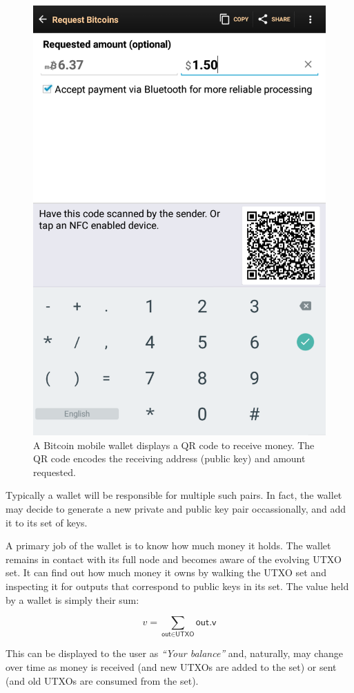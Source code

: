 \begin{figure}[h]
    \centering
    \includegraphics[width=0.6 \columnwidth,keepaspectratio]{figures/wallet-receive.png}
    \caption{A Bitcoin mobile wallet displays a QR code to receive money. The QR code encodes
             the receiving address (public key) and amount requested.}
    \label{fig.wallet-receive}
\end{figure}

Typically a wallet will be responsible for multiple
such pairs. In fact, the wallet may decide to generate a new private and public key pair occassionally,
and add it to its set of keys.

A primary job of the wallet is to know how much money it holds.
The wallet remains in contact with its full node and becomes aware of the evolving UTXO set. It
can find out how much money it owns by walking the UTXO set and inspecting it for outputs that correspond
to public keys in its set. The value held by a wallet is simply their sum:

\[
  v = \sum_{\textsf{out} \in \textsf{UTXO}} \textsf{out.v}
\]

This can be displayed to the user as \emph{``Your balance''} and, naturally, may change over time
as money is received (and new UTXOs are added to the set) or sent (and old UTXOs are consumed from the set).

